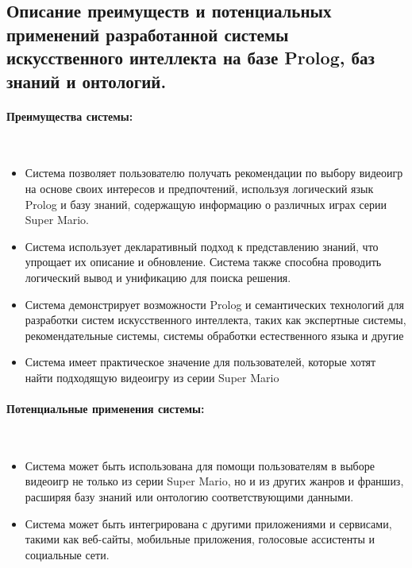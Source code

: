 \documentclass[12pt,onecolumn]{article}
\newcommand{\nparagraph}[1]{\paragraph{#1}\mbox{}\\}
\begin{document}
\subsection{Описание преимуществ и потенциальных применений разработанной системы искусственного интеллекта на базе Prolog, баз знаний и онтологий.}
\nparagraph{Преимущества системы:}
\begin{itemize}
  \item Система позволяет пользователю получать рекомендации по выбору видеоигр на основе своих интересов и предпочтений, используя логический язык Prolog и базу знаний, содержащую информацию о различных играх серии Super Mario.
  \item Система использует декларативный подход к представлению знаний, что упрощает их описание и обновление. Система также способна проводить логический вывод и унификацию для поиска решения.
  \item Система демонстрирует возможности Prolog и семантических технологий для разработки систем искусственного интеллекта, таких как экспертные системы, рекомендательные системы, системы обработки естественного языка и другие
  \item Система имеет практическое значение для пользователей, которые хотят найти подходящую видеоигру из серии Super Mario
\end{itemize}
\nparagraph{Потенциальные применения системы:}
\begin{itemize}
  \item Система может быть использована для помощи пользователям в выборе видеоигр не только из серии Super Mario, но и из других жанров и франшиз, расширяя базу знаний или онтологию соответствующими данными.
  \item Система может быть интегрирована с другими приложениями и сервисами, такими как веб-сайты, мобильные приложения, голосовые ассистенты и социальные сети.
\end{itemize}
\end{document}
